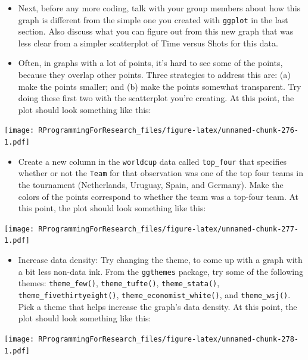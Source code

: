 \documentclass[]{book}
\providecommand{\tightlist}{%
  \setlength{\itemsep}{0pt}\setlength{\parskip}{0pt}}
\theoremstyle{definition}
\theoremstyle{definition}
\theoremstyle{definition}
\theoremstyle{remark}
\begin{document}
\begin{itemize}
\tightlist
\item
  Next, before any more coding, talk with your group members about how
  this graph is different from the simple one you created with
  \texttt{ggplot} in the last section. Also discuss what you can figure
  out from this new graph that was less clear from a simpler scatterplot
  of Time versus Shots for this data.
\item
  Often, in graphs with a lot of points, it's hard to see some of the
  points, because they overlap other points. Three strategies to address
  this are: (a) make the points smaller; and (b) make the points
  somewhat transparent. Try doing these first two with the scatterplot
  you're creating. At this point, the plot should look something like
  this:
\end{itemize}

\texttt{[image: RProgrammingForResearch\_files/figure-latex/unnamed-chunk-276-1.pdf]}

\begin{itemize}
\tightlist
\item
  Create a new column in the \texttt{worldcup} data called
  \texttt{top\_four} that specifies whether or not the \texttt{Team} for
  that observation was one of the top four teams in the tournament
  (Netherlands, Uruguay, Spain, and Germany). Make the colors of the
  points correspond to whether the team was a top-four team. At this
  point, the plot should look something like this:
\end{itemize}

\texttt{[image: RProgrammingForResearch\_files/figure-latex/unnamed-chunk-277-1.pdf]}

\begin{itemize}
\tightlist
\item
  Increase data density: Try changing the theme, to come up with a graph
  with a bit less non-data ink. From the \texttt{ggthemes} package, try
  some of the following themes: \texttt{theme\_few()},
  \texttt{theme\_tufte()}, \texttt{theme\_stata()},
  \texttt{theme\_fivethirtyeight()}, \texttt{theme\_economist\_white()},
  and \texttt{theme\_wsj()}. Pick a theme that helps increase the
  graph's data density. At this point, the plot should look something
  like this:
\end{itemize}

\texttt{[image: RProgrammingForResearch\_files/figure-latex/unnamed-chunk-278-1.pdf]}
\end{document}
